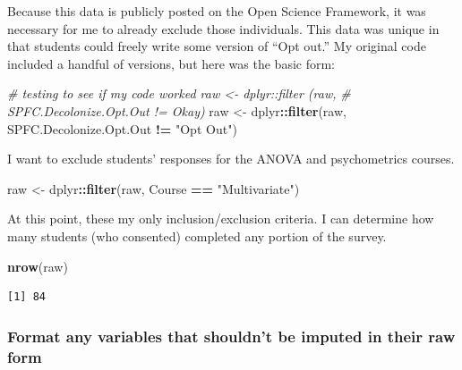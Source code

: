 \documentclass[
  11pt,
]{book}
\newenvironment{Shaded}{\begin{snugshade}}{\end{snugshade}}
\newcommand{\CommentTok}[1]{\textcolor[rgb]{0.37,0.37,0.37}{\textit{#1}}}
\newcommand{\FunctionTok}[1]{\textcolor[rgb]{0.27,0.27,0.27}{\textbf{#1}}}
\newcommand{\NormalTok}[1]{#1}
\newcommand{\OtherTok}[1]{\textcolor[rgb]{0.37,0.37,0.37}{#1}}
\newcommand{\SpecialCharTok}[1]{\textcolor[rgb]{0.43,0.43,0.43}{\textbf{#1}}}
\newcommand{\StringTok}[1]{\textcolor[rgb]{0.5,0.5,0.5}{#1}}
\begin{document}
Because this data is publicly posted on the Open Science Framework, it was necessary for me to already exclude those individuals. This data was unique in that students could freely write some version of ``Opt out.'' My original code included a handful of versions, but here was the basic form:

\begin{Shaded}
\begin{Highlighting}[]
\CommentTok{\# testing to see if my code worked raw \textless{}{-} dplyr::filter (raw,}
\CommentTok{\# SPFC.Decolonize.Opt.Out != \textquotesingle{}Okay\textquotesingle{})}
\NormalTok{raw }\OtherTok{\textless{}{-}}\NormalTok{ dplyr}\SpecialCharTok{::}\FunctionTok{filter}\NormalTok{(raw, SPFC.Decolonize.Opt.Out }\SpecialCharTok{!=} \StringTok{"Opt Out"}\NormalTok{)}
\end{Highlighting}
\end{Shaded}

I want to exclude students' responses for the ANOVA and psychometrics courses.

\begin{Shaded}
\begin{Highlighting}[]
\NormalTok{raw }\OtherTok{\textless{}{-}}\NormalTok{ dplyr}\SpecialCharTok{::}\FunctionTok{filter}\NormalTok{(raw, Course }\SpecialCharTok{==} \StringTok{"Multivariate"}\NormalTok{)}
\end{Highlighting}
\end{Shaded}

At this point, these my only inclusion/exclusion criteria. I can determine how many students (who consented) completed any portion of the survey.

\begin{Shaded}
\begin{Highlighting}[]
\FunctionTok{nrow}\NormalTok{(raw)}
\end{Highlighting}
\end{Shaded}

\begin{verbatim}
[1] 84
\end{verbatim}

\hypertarget{format-any-variables-that-shouldnt-be-imputed-in-their-raw-form}{%
\subsubsection{Format any variables that shouldn't be imputed in their raw form}\label{format-any-variables-that-shouldnt-be-imputed-in-their-raw-form}}
\end{document}
